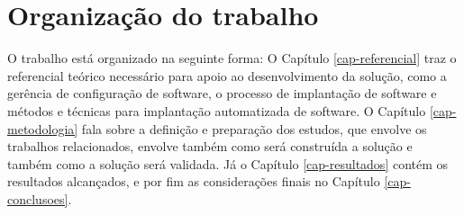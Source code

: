 \section{Organização do trabalho}
\label{sec:organizacao}

O trabalho está organizado na seguinte forma: O Capítulo \ref{cap-referencial}
traz o referencial teórico necessário para apoio ao desenvolvimento da solução,
como a gerência de configuração de software, o processo de implantação de software
 e métodos e técnicas para implantação automatizada de software. O Capítulo
\ref{cap-metodologia}
fala sobre a definição e preparação dos estudos, que envolve os trabalhos relacionados,
envolve também como será construída a solução e também como a solução será validada.
Já o Capítulo \ref{cap-resultados} contém os resultados alcançados, e por fim as
considerações finais no Capítulo \ref{cap-conclusoes}.

